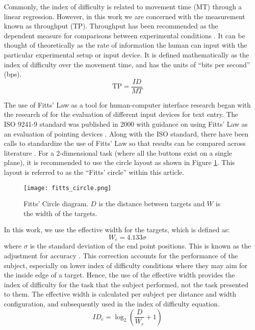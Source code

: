 Commonly, the index of difficulty is related to movement time ($\mathrm{MT}$) through a linear regression.
However, in this work we are concerned with the measurement known as throughput ($\mathrm{TP}$).
Throughput has been recommended as the dependent measure for comparisons between experimental conditions \citep{soukoreff_towards_2004}.
It can be thought of theoretically as the rate of information the human can input with the particular experimental setup or input device.
It is defined mathematically as the index of difficulty over the movement time, and has the units of ``bits per second'' (bps).
\begin{equation}
    \mathrm{TP}=\frac{ID}{MT}
    \label{eq:throughput}
\end{equation}

The use of Fitts' Law as a tool for human-computer interface research began with the research of \citet{card_evaluation_1978} for the evaluation of different input devices for text entry.
The ISO 9241-9 standard was published in 2000 with guidance on using Fitts' Law as an evaluation of pointing devices \citep{international_organization_for_standardization_iso_2000}.
Along with the ISO standard, there have been calls to standardize the use of Fitts' Law so that results can be compared across literature \citep{soukoreff_towards_2004}.
For a 2-dimensional task (where all the buttons exist on a single plane), it is recommended to use the circle layout as shown in Figure \ref{fig:ph_fitts_circle}.
This layout is referred to as the ``Fitts' circle'' within this article.

\begin{figure}
    \centering
    \texttt{[image: fitts\_circle.png]}
    \caption{Fitts' Circle diagram. $D$ is the distance between targets and $W$ is the width of the targets.}
    \label{fig:ph_fitts_circle}
\end{figure}

In this work, we use the effective width for the targets, which is defined as:
\begin{equation}
    W_e = 4.133\sigma
\end{equation}
where $\sigma$ is the standard deviation of the end point positions.
This is known as the adjustment for accuracy \citep{welford_fundamentals_1968}.
This correction accounts for the performance of the subject, especially on lower index of difficulty conditions where they may aim for the inside edge of a target.
Hence, the use of the effective width provides the index of difficulty for the task that the subject performed, not the task presented to them.
The effective width is calculated per subject per distance and width configuration, and subsequently used in the index of difficulty equation.
\begin{equation}
    {ID}_e=\log_2\left(\frac{D}{W_e}+1\right)
\end{equation}


